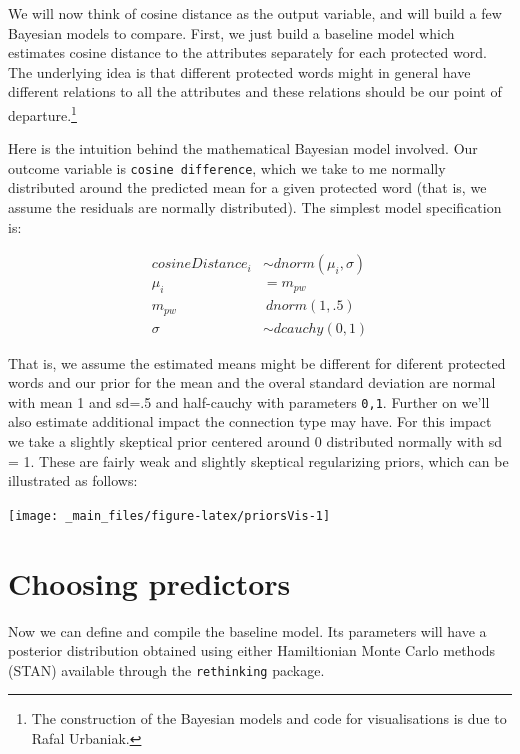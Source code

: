 \documentclass[
  12pt,
]{book}
\begin{document}
We will now think of cosine distance as the output variable, and
will build a few Bayesian models to compare. First, we just build a baseline model which estimates cosine distance to the attributes separately for each protected word. The underlying idea is that different protected words might in general have different relations to all the attributes and these relations should be our point of departure.\footnote{The construction of the Bayesian models and code for visualisations is due to Rafal Urbaniak.}

Here is the intuition behind the mathematical Bayesian model involved. Our outcome variable is \texttt{cosine\ difference}, which we take to me normally distributed around the predicted mean for a given protected word (that is, we assume the residuals are normally distributed). The simplest model specification is:

\begin{align}
cosineDistance_i  & \sim dnorm(\mu_i, \sigma) \\
\mu_i & = m_{pw} \\
m_{pw} & ~ dnorm(1,.5) \\
\sigma &\sim  dcauchy(0,1)
\end{align}

That is, we assume the estimated means might be different for diferent protected words and our prior for the mean and the overal standard deviation are normal with mean 1 and sd=.5 and half-cauchy with parameters \texttt{0,1}. Further on we'll also estimate additional impact the connection type may have. For this impact we take a slightly skeptical prior centered around 0 distributed normally with sd = 1. These are fairly weak and slightly skeptical regularizing priors, which can be illustrated as follows:

\vspace{2mm}

\begin{center}\texttt{[image: \_main\_files/figure-latex/priorsVis-1]} \end{center}

\hypertarget{choosing-predictors}{%
\section{Choosing predictors}\label{choosing-predictors}}

Now we can define and compile the baseline model. Its parameters will have a posterior distribution obtained using either Hamiltionian Monte Carlo methods (STAN) available through the \texttt{rethinking} package.
\end{document}
